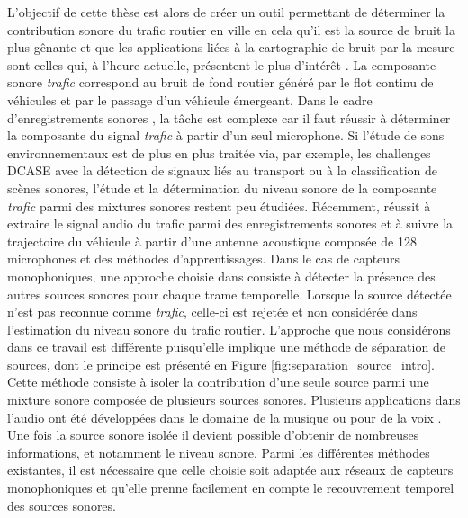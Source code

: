
L'objectif de cette thèse est alors de créer un outil permettant de déterminer la contribution sonore du trafic routier en ville en cela qu'il est la source de bruit la plus gênante et que les applications liées à la cartographie de bruit par la mesure sont celles qui, à l'heure actuelle, présentent le plus d'intérêt \cite{jagniatinskis2014assessment}. La composante sonore  \textit{trafic} correspond au bruit de fond routier généré par le flot continu de véhicules et par le passage d'un véhicule émergeant.
Dans le cadre d'enregistrements sonores , la tâche est complexe car il faut réussir à déterminer la composante du signal \textit{trafic} à partir d'un seul microphone. Si l'étude de sons environnementaux est de plus en plus traitée via, par exemple, les challenges DCASE \cite{stowell2015detection,mesaros2017dcase} avec la détection de signaux liés au transport ou à la classification de scènes sonores, l'étude et la détermination du niveau sonore de la composante \textit{trafic} parmi des mixtures sonores restent peu étudiées. Récemment, \cite{leiba2017large} réussit à extraire le signal audio du trafic parmi des enregistrements sonores et à suivre la trajectoire du véhicule à partir d'une antenne acoustique composée de 128 microphones et des méthodes d'apprentissages.
Dans le cas de capteurs monophoniques, une approche choisie dans \cite{socoro2017anomalous} consiste à détecter la présence des autres sources sonores pour chaque trame temporelle. Lorsque la source détectée n'est pas reconnue comme \textit{trafic}, celle-ci est rejetée et non considérée dans l'estimation du niveau sonore du trafic routier.
L'approche que nous considérons dans ce travail est différente puisqu'elle implique une méthode de séparation de sources, dont le principe est présenté en Figure \ref{fig:separation_source_intro}. Cette méthode consiste à isoler la contribution d'une seule source parmi une mixture sonore composée de plusieurs sources sonores. Plusieurs applications dans l'audio ont été développées dans le domaine de la musique \cite{smaragdis_non-negative_2003,virtanen_monaural_2007} ou pour de la voix \cite{weninger2012supervised,yilmaz2004blind}. Une fois la source sonore isolée il devient possible d'obtenir de nombreuses informations, et notamment le niveau sonore. Parmi les différentes méthodes existantes, il est nécessaire que celle choisie soit adaptée aux réseaux de capteurs monophoniques et qu'elle prenne facilement en compte le recouvrement temporel des sources sonores.

